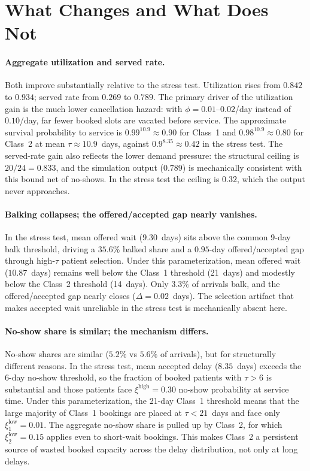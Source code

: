 \documentclass[11pt]{article}
\begin{document}
\section{What Changes and What Does Not}

\paragraph{Aggregate utilization and served rate.}
Both improve substantially relative to the stress test. Utilization rises
from $0.842$ to $0.934$; served rate from $0.269$ to $0.789$. The primary
driver of the utilization gain is the much lower cancellation hazard: with
$\phi = 0.01$--$0.02$/day instead of $0.10$/day, far fewer booked slots are
vacated before service. The approximate survival probability to service is
$0.99^{10.9} \approx 0.90$ for Class~1 and $0.98^{10.9} \approx 0.80$ for
Class~2 at mean $\tau \approx 10.9$~days, against $0.9^{8.35} \approx 0.42$
in the stress test. The served-rate gain also reflects the lower demand
pressure: the structural ceiling is $20/24 = 0.833$, and the simulation
output ($0.789$) is mechanically consistent with this bound net of no-shows.
In the stress test the ceiling is $0.32$, which the output never approaches.

\paragraph{Balking collapses; the offered/accepted gap nearly vanishes.}
In the stress test, mean offered wait ($9.30$~days) sits above the common
9-day balk threshold, driving a $35.6\%$ balked share and a $0.95$-day
offered/accepted gap through high-$\tau$ patient selection. Under this
parameterization, mean offered wait ($10.87$~days) remains well below the
Class~1 threshold (21~days) and modestly below the Class~2 threshold
(14~days). Only $3.3\%$ of arrivals balk, and the offered/accepted gap
nearly closes ($\Delta = 0.02$~days). The selection artifact that makes
accepted wait unreliable in the stress test is mechanically absent here.

\paragraph{No-show share is similar; the mechanism differs.}
No-show shares are similar ($5.2\%$ vs $5.6\%$ of arrivals), but for
structurally different reasons. In the stress test, mean accepted delay
($8.35$~days) exceeds the 6-day no-show threshold, so the fraction of
booked patients with $\tau > 6$ is substantial and those patients face
$\xi^{\text{high}} = 0.30$ no-show probability at service time. Under this
parameterization, the 21-day Class~1 threshold means that the large majority
of Class~1 bookings are placed at $\tau < 21$~days and face only
$\xi^{\text{low}}_1 = 0.01$. The aggregate no-show share is pulled up by
Class~2, for which $\xi^{\text{low}}_2 = 0.15$ applies even to short-wait
bookings. This makes Class~2 a persistent source of wasted booked capacity
across the delay distribution, not only at long delays.
\end{document}
